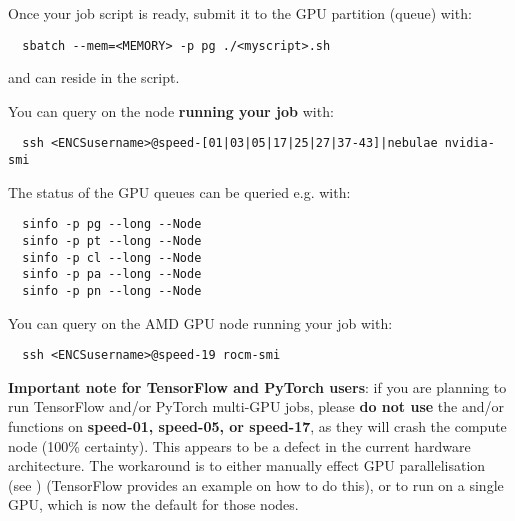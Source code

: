 \noindent
Once your job script is ready, submit it to the GPU partition (queue) with:
\begin{verbatim}
  sbatch --mem=<MEMORY> -p pg ./<myscript>.sh
\end{verbatim}
 and  can reside in the script.

\noindent
You can query  on the node \textbf{running your job} with:
\begin{verbatim}
  ssh <ENCSusername>@speed-[01|03|05|17|25|27|37-43]|nebulae nvidia-smi
\end{verbatim}

\noindent The status of the GPU queues can be queried e.g. with:
\begin{verbatim}
  sinfo -p pg --long --Node
  sinfo -p pt --long --Node
  sinfo -p cl --long --Node
  sinfo -p pa --long --Node
  sinfo -p pn --long --Node
\end{verbatim}

\noindent
You can query  on the AMD GPU node running your job with:
\begin{verbatim}
  ssh <ENCSusername>@speed-19 rocm-smi
\end{verbatim}

\noindent
\textbf{Important note for TensorFlow and PyTorch users}:
if you are planning to run TensorFlow and/or PyTorch multi-GPU jobs, please
\textbf{do not use} the  and/or  functions 
on \textbf{speed-01, speed-05, or speed-17}, as they will crash the compute node (100\% certainty). 
This appears to be a defect in the current hardware architecture.
%
The workaround is to either manually effect GPU parallelisation (see )
(TensorFlow provides an example on how to do this), or to run on a single GPU,
which is now the default for those nodes.\\

